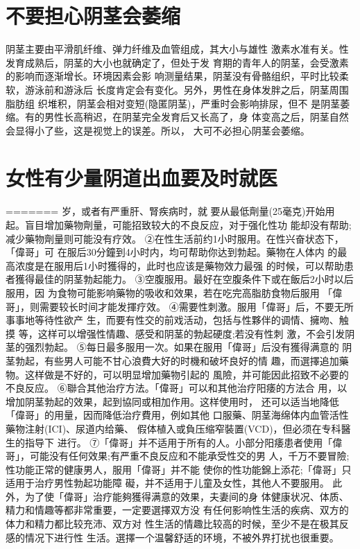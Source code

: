 \documentclass[12pt,UTF8]{ctexbook}
\begin{document}
\section{不要担心阴茎会萎缩}
阴茎主要由平滑肌纤维、弹力纤维及血管组成，其大小与雄性
激素水准有关。性发育成熟后，阴茎的大小也就确定了，但处于发
育期的青年人的阴茎，会受激素的影响而逐渐增长。环境因素会影
响测量结果，阴茎没有骨骼组织，平时比较柔软，游泳前和游泳后
长度肯定会有变化。另外，男性在身体发胖之后，阴茎周围脂肪组
织堆积，阴茎会相对变短(隐匿阴茎)，严重时会影响排尿，但不
是阴茎萎缩。有的男性长高稍迟，在阴茎完全发育后又长高了，身
体变高之后，阴茎自然会显得小了些，这是视觉上的误差。所以，
大可不必担心阴茎会萎缩。

\section{女性有少量阴道出血要及时就医}
=======
岁，或者有严重肝、腎疾病时，就
要从最低劑量(25毫克)开始用
起。盲目增加藥物劑量，可能招致较大的不良反应，对于强化性功
能却没有帮助;减少藥物劑量则可能没有疗效。
②在性生活前约1小时服用。在性兴奋状态下，「偉哥」可
在服后30分鐘到4小时内，均可帮助你达到勃起。藥物在人体内
的最高浓度是在服用后1小时獲得的，此时也应该是藥物效力最强
的时候，可以帮助患者獲得最佳的阴茎勃起能力。
③空腹服用。最好在空腹条件下或在飯后2小时以后服用，因
为食物可能影响藥物的吸收和效果，若在吃完高脂肪食物后服用
「偉哥」，则需要较长时间才能发揮疗效。
④需要性刺激。服用「偉哥」后，不要无所事事地等待性欲产
生，而要有性交的前戏活动，包括与性夥伴的调情、擁吻、触摸
等，这样可以增强性情趣、感受和阴茎的勃起硬度;若没有性刺
激，不会引发阴茎的强烈勃起。
⑤每日最多服用一次。如果在服用「偉哥」后没有獲得满意的
阴茎勃起，有些男人可能不甘心浪費大好的时機和破坏良好的情
趣，而選擇追加藥物。这样做是不好的，可以明显增加藥物引起的
風險，并可能因此招致不必要的不良反应。
⑥聯合其他治疗方法。「偉哥」可以和其他治疗阳痿的方法合
用，以增加阴茎勃起的效果，起到協同或相加作用。这样使用时，
还可以适当地降低「偉哥」的用量，因而降低治疗費用，例如其他
口服藥、阴茎海绵体内血管活性藥物注射(ICI)、尿道内给藥、
假体植入或負压缩窄裝置(VCD)，但必须在专科醫生的指导下
进行。
⑦「偉哥」并不适用于所有的人。小部分阳痿患者使用「偉
哥」，可能没有任何效果;有严重不良反应和不能承受性交的男
人，千万不要冒險;性功能正常的健康男人，服用「偉哥」并不能
使你的性功能錦上添花;「偉哥」只适用于治疗男性勃起功能障
礙，并不适用于儿童及女性，其他人不要服用。
此外，为了使「偉哥」治疗能夠獲得满意的效果，夫妻间的身
体健康状况、体质、精力和情趣等都非常重要，一定要選擇双方没
有任何影响性生活的疾病、双方的体力和精力都比较充沛、双方对
性生活的情趣比较高的时候，至少不是在极其反感的情况下进行性
生活。選擇一个温馨舒适的环境，不被外界打扰也很重要。
\end{document}
